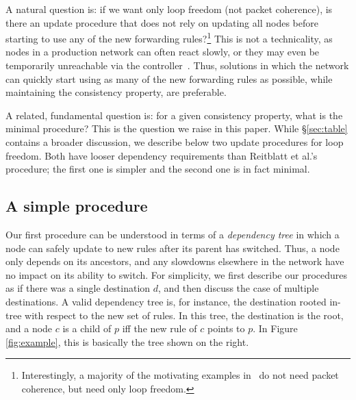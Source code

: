 A natural question is: if we want only loop freedom (not packet coherence), is there an update procedure that does not rely on updating all nodes before starting to use any of the new forwarding rules?\footnote{Interestingly, a majority of the motivating examples in~\cite{safeupdate} do not need packet coherence, but need only loop freedom.}  This is not a technicality, as nodes in a production network can often react slowly, or they may even be temporarily unreachable via the controller~\cite{b4}.  Thus, solutions in which the network can quickly start using as many of the new forwarding rules as possible, while maintaining the consistency property, are preferable.

A related, fundamental question is: for a given consistency property, what is the minimal procedure? This is the question we raise in this paper. While \S\ref{sec:table} contains a broader discussion, we describe below two update procedures for loop freedom. Both have looser dependency requirements than Reitblatt et al.'s procedure; the first one is simpler and the second one is in fact minimal.



\subsection{A simple procedure}
\label{sec:practical}


Our first procedure can be understood in terms of a {\em dependency tree} in which a node can safely update to new rules after its parent has switched. Thus, a node only depends on its ancestors, and any slowdowns elsewhere in the network have no impact on its ability to switch.
For simplicity, we first describe our procedures as if there was a single destination $d$, and then discuss the case of multiple destinations. A valid dependency tree is, for instance, the destination rooted in-tree with respect to the new set of rules. In this tree, the destination is the root, and a node $c$ is a child of $p$ iff the new rule of $c$ points to $p$. In Figure \ref{fig:example}, this is basically the tree shown on the right.

